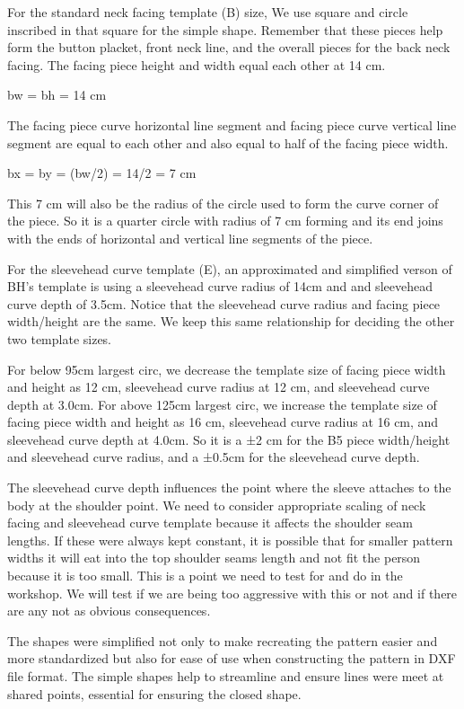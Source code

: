 For the standard neck facing template (B) size, We use square and circle inscribed in that square for the simple shape. Remember that these pieces help form the button placket, front neck line, and the overall pieces for the back neck facing. The facing piece height and width equal each other at 14 cm.

bw = bh = 14 cm

The facing piece curve horizontal line segment and facing piece curve vertical line segment are equal to each other and also equal to half of the facing piece width.

bx = by = (bw/2) = 14/2 = 7 cm

This 7 cm will also be the radius of the circle used to form the curve corner of the piece. So it is a quarter circle with radius of 7 cm forming and its end joins with the ends of horizontal and vertical line segments of the piece.

For the sleevehead curve template (E), an approximated and simplified verson of BH's template is using a sleevehead curve radius of 14cm and and sleevehead curve depth of 3.5cm. Notice that the sleevehead curve radius and facing piece width/height are the same. We keep this same relationship for deciding the other two template sizes.

For below 95cm largest circ, we decrease the template size of facing piece width and height as 12 cm, sleevehead curve radius at 12 cm, and sleevehead curve depth at 3.0cm.
For above 125cm largest circ, we increase the template size of facing piece width and height as 16 cm, sleevehead curve radius at 16 cm, and sleevehead curve depth at 4.0cm.
So it is a ±2 cm for the B5 piece width/height and sleevehead curve radius, and a ±0.5cm for the sleevehead curve depth.

The sleevehead curve depth influences the point where the sleeve attaches to the body at the shoulder point. We need to consider appropriate scaling of neck facing and sleevehead curve template because it affects the shoulder seam lengths. If these were always kept constant, it is possible that for smaller pattern widths it will eat into the top shoulder seams length and not fit the person because it is too small. This is a point we need to test for and do in the workshop. We will test if we are being too aggressive with this or not and if there are any not as obvious consequences.

The shapes were simplified not only to make recreating the pattern easier and more standardized but also for ease of use when constructing the pattern in DXF file format. The simple shapes help to streamline and ensure lines were meet at shared points, essential for ensuring the closed shape. 

